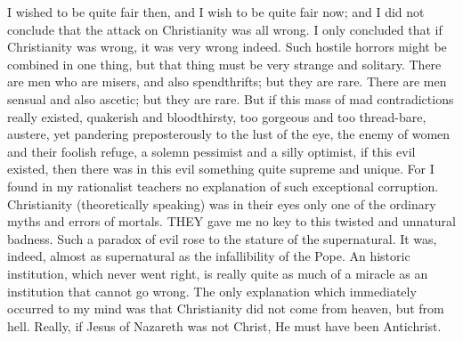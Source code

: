 I wished to be quite fair then, and I wish to be quite fair now; and I did not conclude that the attack on Christianity was all wrong. I only concluded that if Christianity was wrong, it was very wrong indeed. Such hostile horrors might be combined in one thing, but that thing must be very strange and solitary. There are men who are misers, and also spendthrifts; but they are rare. There are men sensual and also ascetic; but they are rare. But if this mass of mad contradictions really existed, quakerish and bloodthirsty, too gorgeous and too thread-bare, austere, yet pandering preposterously to the lust of the eye, the enemy of women and their foolish refuge, a solemn pessimist and a silly optimist, if this evil existed, then there was in this evil something quite supreme and unique. For I found in my rationalist teachers no explanation of such exceptional corruption. Christianity (theoretically speaking) was in their eyes only one of the ordinary myths and errors of mortals. THEY gave me no key to this twisted and unnatural badness. Such a paradox of evil rose to the stature of the supernatural. It was, indeed, almost as supernatural as the infallibility of the Pope. An historic institution, which never went right, is really quite as much of a miracle as an institution that cannot go wrong. The only explanation which immediately occurred to my mind was that Christianity did not come from heaven, but from hell. Really, if Jesus of Nazareth was not Christ, He must have been Antichrist.


